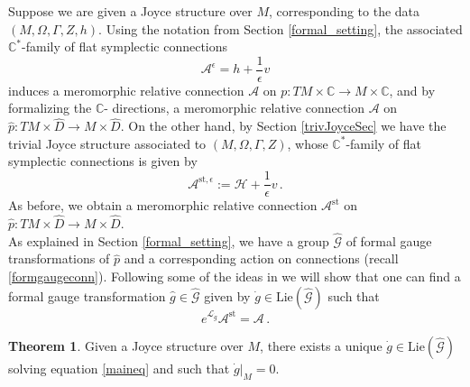 \documentclass{article}
\theoremstyle{definition}
\newtheorem{theorem}{Theorem}[section]
\numberwithin{equation}{section}
\begin{document}
Suppose we are given a Joyce structure over $M$, corresponding to the data $(M,\Omega,\Gamma,Z,h)$. Using the notation from Section \ref{formal_setting}, the associated $\mathbb{C}^{*}$-family of flat symplectic connections \begin{equation*}
    \mathcal{A}^{\epsilon}=h+\frac{1}{\epsilon}v
\end{equation*} induces a meromorphic relative connection $\mathcal{A}$ on $p:TM\times \mathbb{C}\to M\times \mathbb{C}$, and by formalizing the $\mathbb{C}$- directions, a meromorphic relative connection $\mathcal{A}$ on $\hat{p}:TM\times \widehat{D}\to M \times \widehat{D}$. On the other hand, by Section \ref{trivJoyceSec} we have the trivial Joyce structure associated to $(M,\Omega,\Gamma,Z)$, whose $\mathbb{C}^*$-family of flat symplectic connections is given by 
\begin{equation*}
    \mathcal{A}^{\text{st},\epsilon}:=\mathcal{H}+\frac{1}{\epsilon}v\,.
\end{equation*}
As before, we obtain a meromorphic relative connection $\mathcal{A}^{\text{st}}$ on $\hat{p}:TM\times \widehat{D}\to M \times \widehat{D}$.\\

As explained in Section \ref{formal_setting}, we have a group $\widehat{\mathcal{G}}$ of formal gauge transformations of $\hat{p}$ and a corresponding action on connections (recall \eqref{formgaugeconn}). Following some of the ideas in \cite[Section 5.3]{KSresurgence}
we will show that one can find a formal gauge transformation $\hat{g}\in \widehat{\mathcal{G}}$ given by $\dot{g}\in \text{Lie}(\widehat{\mathcal{G}})$ such that 
\begin{equation}\label{maineq}
    e^{\mathcal{L}_{\dot{g}}}\mathcal{A}^{\text{st}}=\mathcal{A}\,.
\end{equation}


\begin{theorem}\label{mt1}
    Given a Joyce structure over $M$, there exists a unique $\dot{g}\in \text{Lie}(\widehat{\mathcal{G}})$ solving equation \eqref{maineq} and such that $\dot{g}|_{M}=0$.
\end{theorem}
\end{document}
